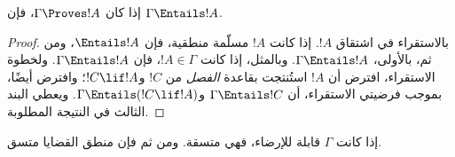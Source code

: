 \documentclass[../../../include/open-logic-section]{subfiles}
\begin{document}


\begin{thm}[السلامة] 
إذا كان $\Gamma\Proves!A$، فإن
$\Gamma \Entails !A$. 
\end{thm}

\begin{proof} 
بالاستقراء في اشتقاق $!A$. إذا كانت $!A$ مسلّمة منطقية، فإن $\Entails
!A$، ومن ثم، بالأولى، $\Gamma \Entails!A$. وبالمثل، إذا كانت $!A \in \Gamma$،
فإن $\Gamma \Entails!A$. ولخطوة الاستقراء، افترض أن $!A$ استُنتجت بقاعدة
\emph{الفصل} من $!C$ و$!C\lif!A$؛ وافترض أيضًا، بموجب فرضيتي الاستقراء، أن
$\Gamma \Entails !C$ و$\Gamma \Entails (!C\lif !A)$. ويعطي البند الثالث
في  النتيجة المطلوبة. 
\end{proof}

\begin{cor} 
إذا كانت $\Gamma$ قابلة للإرضاء، فهي متسقة. ومن ثم فإن
منطق القضايا متسق. 
\end{cor}
\end{document}
